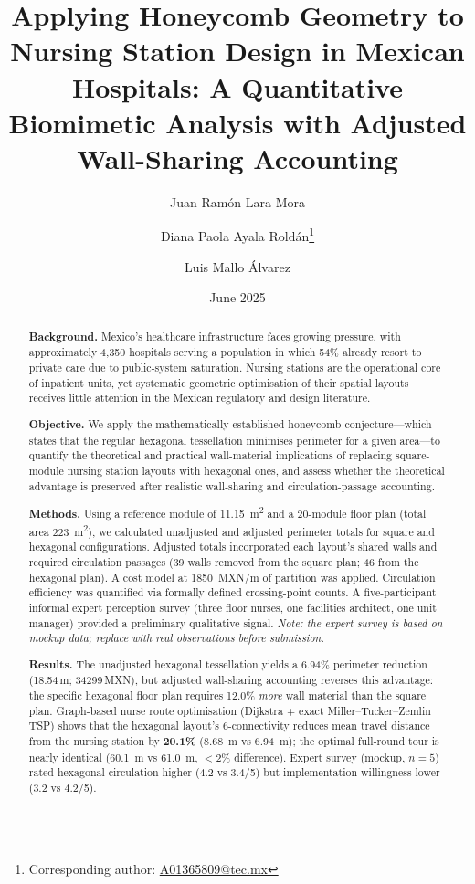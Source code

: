 \documentclass[12pt,a4paper]{article}
\title{\textbf{Applying Honeycomb Geometry to Nursing Station Design in Mexican Hospitals:
A Quantitative Biomimetic Analysis with Adjusted Wall-Sharing Accounting}}
\author[1]{Juan Ram\'on Lara Mora}
\author[2]{Diana Paola Ayala Rold\'an\thanks{Corresponding author: \href{mailto:A01365809@tec.mx}{A01365809@tec.mx}}}
\author[3]{Luis Mallo \'Alvarez}
\affil[1]{Tecnol\'ogico de Monterrey, Campus Ciudad de M\'exico, School of Engineering and Sciences}
\affil[2]{Tecnol\'ogico de Monterrey, Campus Ciudad de M\'exico, School of Engineering and Sciences}
\affil[3]{Universidad Pontificia de Salamanca / Alebat Education, M\'aster de Ingenier\'ia Hospitalaria}
\date{June 2025}
\begin{document}
\maketitle

\begin{abstract}
\noindent\textbf{Background.}
Mexico's healthcare infrastructure faces growing pressure, with approximately
4{,}350 hospitals serving a population in which 54\% already resort to private care
due to public-system saturation.
Nursing stations are the operational core of inpatient units, yet systematic
geometric optimisation of their spatial layouts receives little attention in the
Mexican regulatory and design literature.

\noindent\textbf{Objective.}
We apply the mathematically established honeycomb conjecture---which states that
the regular hexagonal tessellation minimises perimeter for a given area---to
quantify the theoretical and practical wall-material implications of replacing
square-module nursing station layouts with hexagonal ones, and assess whether the
theoretical advantage is preserved after realistic wall-sharing and circulation-passage
accounting.

\noindent\textbf{Methods.}
Using a reference module of \SI{11.15}{\metre\squared} and a 20-module floor plan
(total area \SI{223}{\metre\squared}), we calculated unadjusted and adjusted
perimeter totals for square and hexagonal configurations.
Adjusted totals incorporated each layout's shared walls and required circulation
passages (39 walls removed from the square plan; 46 from the hexagonal plan).
A cost model at \SI{1850}{MXN/m} of partition was applied.
Circulation efficiency was quantified via formally defined crossing-point counts.
A five-participant informal expert perception survey (three floor nurses, one
facilities architect, one unit manager) provided a preliminary qualitative signal.
\textit{Note: the expert survey is based on mockup data; replace with real observations
before submission.}

\noindent\textbf{Results.}
The unadjusted hexagonal tessellation yields a 6.94\% perimeter reduction
(18.54\,m; \num{34299}\,MXN), but adjusted wall-sharing accounting reverses this
advantage: the specific hexagonal floor plan requires 12.0\% \emph{more} wall
material than the square plan.
Graph-based nurse route optimisation (Dijkstra + exact Miller--Tucker--Zemlin TSP)
shows that the hexagonal layout's 6-connectivity reduces mean travel distance from
the nursing station by \textbf{20.1\%} (\SI{8.68}{\metre} vs \SI{6.94}{\metre});
the optimal full-round tour is nearly identical (\SI{60.1}{\metre} vs \SI{61.0}{\metre},
$<$2\% difference).
Expert survey (mockup, $n=5$) rated hexagonal circulation higher (4.2 vs 3.4/5)
but implementation willingness lower (3.2 vs 4.2/5).


\end{abstract}
\end{document}
